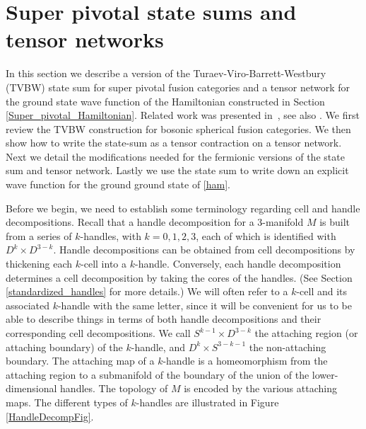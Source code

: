 


\section{Super pivotal state sums and tensor networks} \label{state_sums}

In this section we describe a version of the Turaev-Viro-Barrett-Westbury (TVBW) state sum \cite{Turaev1992,Barrett1996}
for super pivotal fusion categories 
and a tensor network for the ground state wave function of the Hamiltonian constructed in Section \ref{Super_pivotal_Hamiltonian}.
Related 
work was presented in~\cite{bhardwaj2016}, 
see also \cite{Bultinck2017}.
We first review the TVBW construction for bosonic spherical fusion categories. 
We then show how to write the state-sum as a tensor contraction on a tensor 
network.
Next we detail the modifications needed for the fermionic versions of the state sum and tensor network.
Lastly we use the state sum to write down an explicit wave function for the ground ground state of \eqref{ham}.

\medskip

Before we begin, we need to establish some terminology regarding cell and handle decompositions. 
Recall that a handle decomposition for a 
3-manifold $M$ is built from a series of $k$-handles, with $k=0,1,2,3$, each of which is identified with $D^k\times D^{3-k}$. 
Handle decompositions can be obtained from cell decompositions by thickening each $k$-cell into a $k$-handle.
Conversely, each handle decomposition determines a cell decomposition by taking the cores of the handles.
(See Section \ref{standardized_handles} for more details.)
We will often refer to a $k$-cell and its associated $k$-handle with the same letter, since
it will be convenient for us to be able to describe things in terms of both handle decompositions 
and their corresponding cell decompositions. 
We call $S^{k-1} \times D^{3-k}$ the attaching region (or attaching boundary) of the $k$-handle,
and $D^k\times S^{3-k-1}$ the non-attaching boundary.
The attaching map of a $k$-handle is a homeomorphism from the attaching region to 
a submanifold of the boundary of the union of the lower-dimensional handles.
The topology of $M$ is encoded by the various attaching maps.
The different types of $k$-handles are illustrated in Figure 
\ref{HandleDecompFig}.

